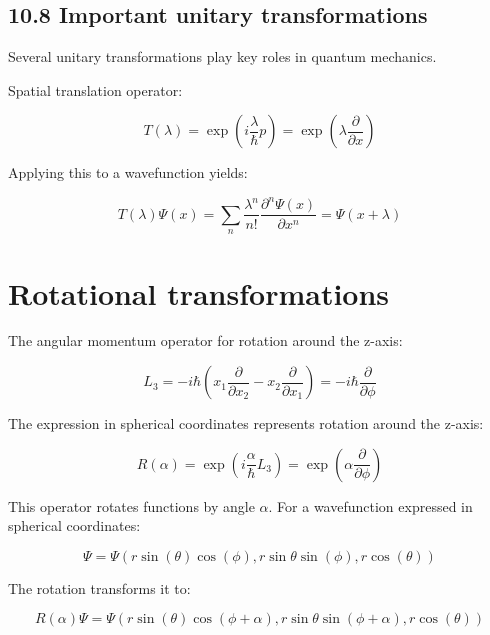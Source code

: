 \documentclass[italian]{HKNdocument}
\begin{document}
\subsection*{10.8 Important unitary transformations}
Several unitary transformations play key roles in quantum mechanics.

Spatial translation operator:

\begin{equation*}
T(\lambda)=\exp \left(i \frac{\lambda}{\hbar} p\right)=\exp \left(\lambda \frac{\partial}{\partial x}\right) \tag{10.47}
\end{equation*}

Applying this to a wavefunction yields:

\begin{equation*}
T(\lambda) \Psi(x)=\sum_{n} \frac{\lambda^{n}}{n!} \frac{\partial^{n} \Psi(x)}{\partial x^{n}}=\Psi(x+\lambda) \tag{10.48}
\end{equation*}

\section*{Rotational transformations}

The angular momentum operator for rotation around the z-axis:

\begin{equation*}
L_{3}=-i \hbar\left(x_{1} \frac{\partial}{\partial x_{2}}-x_{2} \frac{\partial}{\partial x_{1}}\right)=-i \hbar \frac{\partial}{\partial \phi} \tag{10.49}
\end{equation*}


The expression in spherical coordinates represents rotation around the z-axis:

\begin{equation*}
R(\alpha)=\exp \left(i \frac{\alpha}{\hbar} L_{3}\right)=\exp \left(\alpha \frac{\partial}{\partial \phi}\right) \tag{10.50}
\end{equation*}

This operator rotates functions by angle $\alpha$. For a wavefunction expressed in spherical coordinates:

\begin{equation*}
\Psi=\Psi(r \sin (\theta) \cos (\phi), r \sin \theta \sin (\phi), r \cos (\theta)) \tag{10.51}
\end{equation*}

The rotation transforms it to:

\begin{equation*}
R(\alpha) \Psi=\Psi(r \sin (\theta) \cos (\phi+\alpha), r \sin \theta \sin (\phi+\alpha), r \cos (\theta)) \tag{10.52}
\end{equation*}
\end{document}
